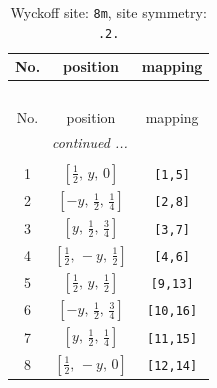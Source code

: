 \documentclass[fleqn,8pt]{jsarticle}
\begin{document}
\begin{longtable}{ccc}
\caption{Wyckoff site: {\tt 8m}, site symmetry: {\tt .2.}}
 \\
 \hline \hline
No. & position & mapping \\ \hline \endfirsthead

\multicolumn{2}{l}{\tablename\ \thetable{}} \\
 \hline \hline
No. & position & mapping \\ \hline \endhead

 \hline \hline
\multicolumn{2}{r}{\footnotesize\it continued ...} \\ \endfoot

 \hline \hline
\multicolumn{2}{r}{} \\ \endlastfoot

1 & $\left[ \frac{1}{2},\, y,\, 0 \right]$ & {\tt [1,5]} \\ \hline
2 & $\left[ - y,\, \frac{1}{2},\, \frac{1}{4} \right]$ & {\tt [2,8]} \\ \hline
3 & $\left[ y,\, \frac{1}{2},\, \frac{3}{4} \right]$ & {\tt [3,7]} \\ \hline
4 & $\left[ \frac{1}{2},\, - y,\, \frac{1}{2} \right]$ & {\tt [4,6]} \\ \hline
5 & $\left[ \frac{1}{2},\, y,\, \frac{1}{2} \right]$ & {\tt [9,13]} \\ \hline
6 & $\left[ - y,\, \frac{1}{2},\, \frac{3}{4} \right]$ & {\tt [10,16]} \\ \hline
7 & $\left[ y,\, \frac{1}{2},\, \frac{1}{4} \right]$ & {\tt [11,15]} \\ \hline
8 & $\left[ \frac{1}{2},\, - y,\, 0 \right]$ & {\tt [12,14]} \\
\end{longtable}
\renewcommand{\arraystretch}{1.2}
\end{document}
